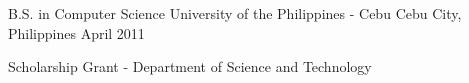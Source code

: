 

\begin{cventries}

  \cventry
    {B.S. in Computer Science} %
    {University of the Philippines - Cebu} %
    {Cebu City, Philippines} %
    {April 2011} %
    {
      \begin{cvitems} %
        \item {Scholarship Grant - Department of Science and Technology}
      \end{cvitems}
    }

\end{cventries}
